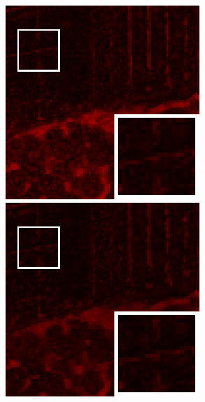 \begin{figure}[t]
\begin{center}
		
		\vspace{1mm}
		
		\begin{minipage}{0.15\hsize}
			\centerline{\includegraphics[width=\hsize]{./fig_supplement/SAM_map_color_woboundary/Beltsville/sam_map_SSTV.eps}} %
		\end{minipage}
		\begin{minipage}{0.15\hsize}
			\centerline{\includegraphics[width=\hsize]{./fig_supplement/SAM_map_color_woboundary/Beltsville/sam_map_HSSTV_L1.eps}} %

\end{minipage}
\end{center}
\end{figure}

